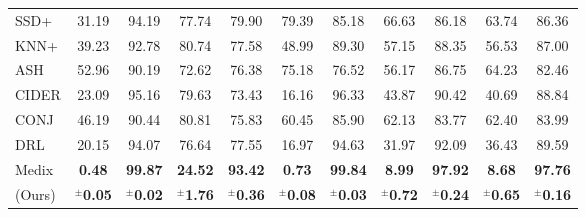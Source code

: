 \documentclass[10pt]{article} %
\theoremstyle{plain}
\theoremstyle{definition}
\begin{document}
\begin{table}[t]
{\begin{tabular}{lcccccccccc}
SSD+ & 31.19 & 94.19 & 77.74 & 79.90 & 79.39 & 85.18 & 66.63 & 86.18 & 63.74 & 86.36 \\

KNN+ & 39.23 & 92.78 & 80.74 & 77.58 & 48.99 & 89.30 & 57.15 & 88.35 & 56.53 & 87.00 \\

ASH & 52.96 & 90.19 & 72.62 & 76.38 & 75.18 & 76.52 & 56.17 & 86.75 & 64.23 & 82.46 \\

CIDER & 23.09 & 95.16 & 79.63 & 73.43 & 16.16 & 96.33 & 43.87 & 90.42 & 40.69 & 88.84 \\

CONJ & 46.19 & 90.44 & 80.81 & 75.83 & 60.45 & 85.90 & 62.13 & 83.77 & 62.40 & 83.99 \\

DRL & 20.15 & 94.07 & 76.64 & 77.55 & 16.97 & 94.63 & 31.97 & 92.09 & 36.43 & 89.59 \\

\rowcolor[HTML]{DCEEFF} Medix & \textbf{0.48} & \textbf{99.87} & \textbf{24.52} & \textbf{93.42} & \textbf{0.73} & \textbf{99.84} & \textbf{8.99} & \textbf{97.92} & \textbf{8.68} & \textbf{97.76} \\

\rowcolor[HTML]{DCEEFF} (Ours) & $^{\pm}$\textbf{0.05} & $^{\pm}$\textbf{0.02} & $^{\pm}$\textbf{1.76} & $^{\pm}$\textbf{0.36} & $^{\pm}$\textbf{0.08} & $^{\pm}$\textbf{0.03} & $^{\pm}$\textbf{0.72} & $^{\pm}$\textbf{0.24} & $^{\pm}$\textbf{0.65} & $^{\pm}$\textbf{0.16} \\
\hline
\end{tabular}
}
\label{tab:cifar100_resnet34}
\end{table}
\end{document}
